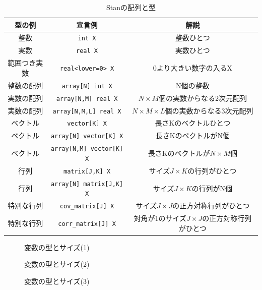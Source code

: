 \documentclass{ltjsbook}
\begin{document}
\begin{table}[ht]
	\centering
	\caption{Stanの配列と型}
	\begin{tabular}{ccc}
		型の例    & 宣言例                     & 解説                               \\\hline
		整数     & \verb|int X|            & 整数ひとつ                            \\
		実数     & \verb|real X|           & 実数ひとつ                            \\
		範囲つき実数 & \verb|real<lower=0> X|  & 0より大きい数字の入るX                     \\
		整数の配列  & \verb|array[N] int X|         & N個の整数                            \\
		実数の配列  & \verb|array[N,M] real X|      & $N\times M$個の実数からなる2次元配列         \\
		実数の配列  & \verb|array[N,M,L] real X|    & $N\times M\times L$個の実数からなる3次元配列 \\
		ベクトル   & \verb|vector[K] X|      & 長さKのベクトルひとつ                      \\
		ベクトル   & \verb|array[N] vector[K] X|   & 長さKのベクトルがN個                      \\
		ベクトル   & \verb|array[N,M] vector[K] X| & 長さKのベクトルが$N\times M$個            \\
		行列     & \verb|matrix[J,K] X|    & サイズ$J\times K$の行列がひとつ            \\
		行列     & \verb|array[N] matrix[J,K] X| & サイズ$J\times K$の行列がN個             \\
		特別な行列  & \verb|cov_matrix[J] X|  & サイズ$J\times J$の正方対称行列がひとつ        \\
		特別な行列  & \verb|corr_matrix[J] X| & 対角が1のサイズ$J\times J$の正方対称行列がひとつ   \\\hline
	\end{tabular}
	\label{tbl:09_01}
\end{table}

\begin{figure}[ht]
	\centering
	\resizebox{\linewidth}{!}{}
	\caption{変数の型とサイズ(1)}
	\label{fig:09_02}
\end{figure}
\begin{figure}[ht]
	\centering
	\resizebox{\linewidth}{!}{}
	\caption{変数の型とサイズ(2)}
	\label{fig:09_03}
\end{figure}
\begin{figure}[ht]
	\centering
	\resizebox{\linewidth}{!}{}
	\caption{変数の型とサイズ(3)}
	\label{fig:09_04}
\end{figure}
\end{document}
